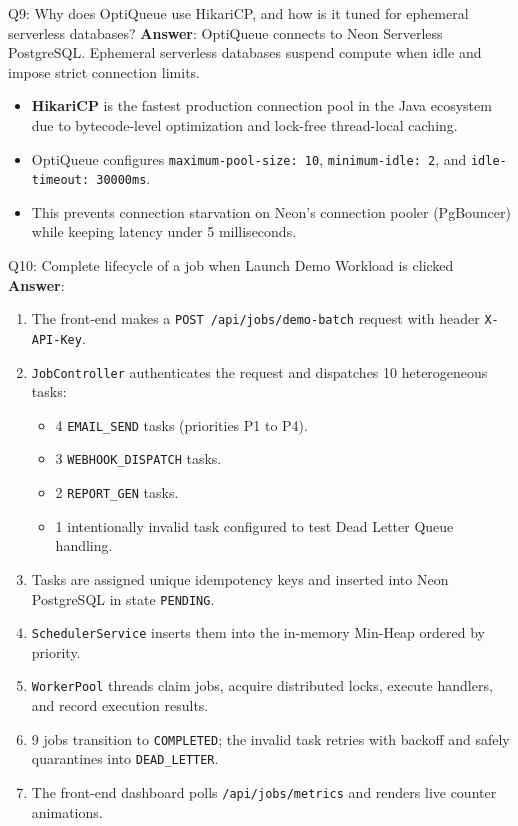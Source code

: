 \documentclass[11pt,a4paper]{article}
\begin{document}
\begin{interviewbox}{Q9: Why does OptiQueue use HikariCP, and how is it tuned for ephemeral serverless databases?}
\textbf{Answer}:
OptiQueue connects to Neon Serverless PostgreSQL. Ephemeral serverless databases suspend compute when idle and impose strict connection limits.
\begin{itemize}
    \item \textbf{HikariCP} is the fastest production connection pool in the Java ecosystem due to bytecode-level optimization and lock-free thread-local caching.
    \item OptiQueue configures \texttt{maximum-pool-size: 10}, \texttt{minimum-idle: 2}, and \texttt{idle-timeout: 30000ms}.
    \item This prevents connection starvation on Neon's connection pooler (PgBouncer) while keeping latency under 5 milliseconds.
\end{itemize}
\end{interviewbox}

\begin{interviewbox}{Q10: Complete lifecycle of a job when Launch Demo Workload is clicked}
\textbf{Answer}:
\begin{enumerate}
    \item The front-end makes a \texttt{POST /api/jobs/demo-batch} request with header \texttt{X-API-Key}.
    \item \texttt{JobController} authenticates the request and dispatches 10 heterogeneous tasks:
    \begin{itemize}
        \item 4 \texttt{EMAIL\_SEND} tasks (priorities P1 to P4).
        \item 3 \texttt{WEBHOOK\_DISPATCH} tasks.
        \item 2 \texttt{REPORT\_GEN} tasks.
        \item 1 intentionally invalid task configured to test Dead Letter Queue handling.
    \end{itemize}
    \item Tasks are assigned unique idempotency keys and inserted into Neon PostgreSQL in state \texttt{PENDING}.
    \item \texttt{SchedulerService} inserts them into the in-memory Min-Heap ordered by priority.
    \item \texttt{WorkerPool} threads claim jobs, acquire distributed locks, execute handlers, and record execution results.
    \item 9 jobs transition to \texttt{COMPLETED}; the invalid task retries with backoff and safely quarantines into \texttt{DEAD\_LETTER}.
    \item The front-end dashboard polls \texttt{/api/jobs/metrics} and renders live counter animations.
\end{enumerate}
\end{interviewbox}
\end{document}
